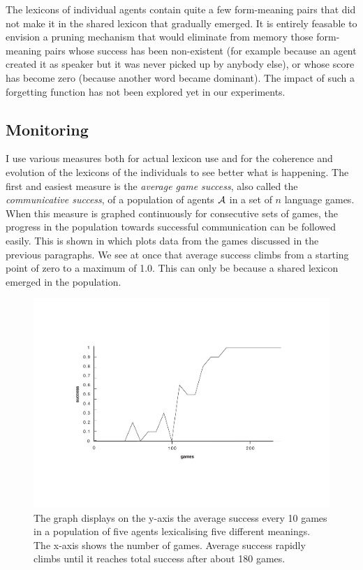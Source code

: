 The lexicons of individual agents contain quite a few form-meaning
pairs that did not make it in the shared lexicon that gradually 
emerged. It is entirely feasable to envision a pruning mechanism 
that would eliminate from memory those form-meaning pairs whose 
success has been non-existent (for example because an agent created
it as speaker but it was never picked up by anybody else), 
or whose score has become zero (because another word became
dominant). The impact of such a forgetting
function has not been explored yet in our experiments. 

\subsection{Monitoring} 

I use various measures both for actual lexicon use and for 
the coherence and evolution of the lexicons of
the individuals to see better what is happening. 
The first and easiest measure is the {\itshape average game success}, 
also called the {\itshape communicative success}, 
of a population of agents ${\cal A}$ in a set of $n$ language games. 
When this measure is graphed continuously for consecutive sets of 
games, the progress in the population
towards successful communication can be followed easily. This
is shown in  which plots data from the 
games discussed in the previous paragraphs. We see at once that
average success climbs from a starting point of zero
to a maximum of 1.0. This can only be because a shared lexicon 
emerged in the population. 

\begin{figure}[htbp]
  \centerline{\includegraphics[width=\textwidth]{chap5/figs/success.pdf}}
\caption{\label{success}The graph displays on the y-axis the average success every 10 games
in a population of five agents lexicalising five
different meanings. The x-axis 
shows the number of games. Average success
rapidly climbs until it reaches total success after 
about 180 games.}
\end{figure}

